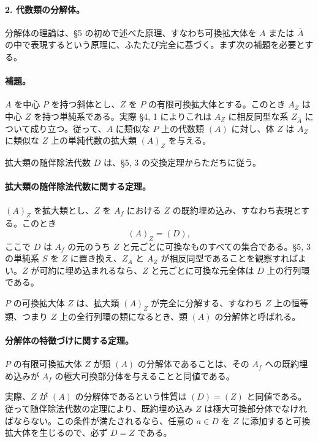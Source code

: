 \paragraph{2. 代数類の分解体。}
分解体の理論は、§5 の初めで述べた原理、すなわち可換拡大体を \(A\) または \(\overline A\) の中で表現するという原理に、ふたたび完全に基づく。まず次の補題を必要とする。

\paragraph{補題。}
\(A\) を中心 \(P\) を持つ斜体とし、\(Z\) を \(P\) の有限可換拡大体とする。このとき \(A_Z\) は中心 \(Z\) を持つ単純系である。実際 §4, 1 によりこれは \(A_Z\) に相反同型な系 \(Z_{\overline A}\) について成り立つ。従って、\(A\) に類似な \(P\) 上の代数類 \((A)\) に対し、体 \(Z\) は \(A_Z\) に類似な \(Z\) 上の単純代数の拡大類 \((A)_Z\) を与える。

拡大類の随伴除法代数 \(D\) は、§5, 3 の交換定理からただちに従う。

\paragraph{拡大類の随伴除法代数に関する定理。}
\((A)_Z\) を拡大類とし、\(Z\) を \(A_f\) における \(Z\) の既約埋め込み、すなわち表現とする。このとき
\[
        (A)_Z=(D),
\]
ここで \(D\) は \(A_f\) の元のうち \(Z\) と元ごとに可換なものすべての集合である。§5, 3 の単純系 \(S\) を \(Z\) に置き換え、\(Z_A\) と \(A_Z\) が相反同型であることを観察すればよい。\(Z\) が可約に埋め込まれるなら、\(Z\) と元ごとに可換な元全体は \(D\) 上の行列環である。

\(P\) の可換拡大体 \(Z\) は、拡大類 \((A)_Z\) が完全に分解する、すなわち \(Z\) 上の恒等類、つまり \(Z\) 上の全行列環の類になるとき、類 \((A)\) の分解体と呼ばれる。

\paragraph{分解体の特徴づけに関する定理。}
\(P\) の有限可換拡大体 \(Z\) が類 \((A)\) の分解体であることは、その \(A_f\) への既約埋め込みが \(A_f\) の極大可換部分体を与えることと同値である。

実際、\(Z\) が \((A)\) の分解体であるという性質は \((D)=(Z)\) と同値である。従って随伴除法代数の定理により、既約埋め込み \(Z\) は極大可換部分体でなければならない。この条件が満たされるなら、任意の \(a\in D\) を \(Z\) に添加すると可換拡大体を生じるので、必ず \(D=Z\) である。

